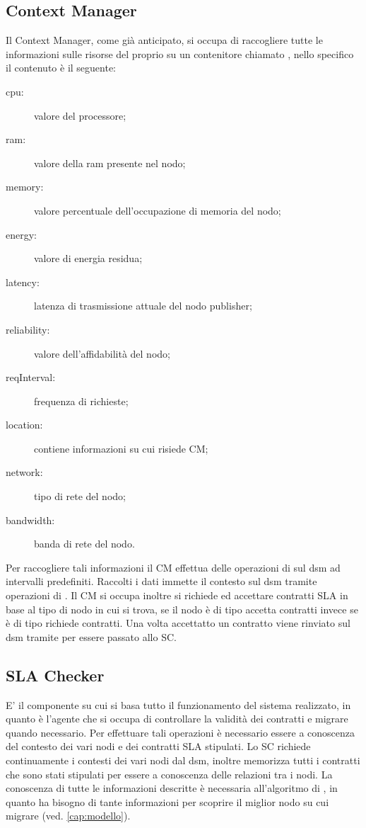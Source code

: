 \subsection{Context Manager}
Il Context Manager, come già anticipato, si occupa di raccogliere tutte le informazioni sulle risorse del proprio su un contenitore chiamato , nello specifico il contenuto è il seguente:
\begin{description}
	\item[cpu:] valore del processore;
	\item[ram:] valore della ram presente nel nodo;
	\item[memory:] valore percentuale dell'occupazione di memoria del nodo;
	\item[energy:] valore di energia residua;
	\item[latency:] latenza di trasmissione attuale del nodo publisher;
	\item[reliability:] valore dell'affidabilità del nodo;
	\item[reqInterval:] frequenza di richieste;
	\item[location:] contiene informazioni su cui risiede CM;
	\item[network:] tipo di rete del nodo;
	\item[bandwidth:] banda di rete del nodo.
\end{description}
Per raccogliere tali informazioni il CM effettua delle operazioni di  sul dsm ad intervalli predefiniti. Raccolti i dati immette il contesto sul dsm tramite operazioni di . Il CM si occupa inoltre si richiede ed accettare contratti SLA in base al tipo di nodo in cui si trova, se il nodo è di tipo  accetta contratti invece se è di tipo  richiede contratti. Una volta accettatto un contratto viene rinviato sul dsm tramite  per essere passato allo SC.
\subsection{SLA Checker}
E' il componente su cui si basa tutto il funzionamento del sistema realizzato, in quanto è l'agente che si occupa di controllare la validità dei contratti e migrare quando necessario. Per effettuare tali operazioni è necessario essere a conoscenza del contesto dei vari nodi e dei contratti SLA stipulati. Lo SC richiede continuamente i contesti dei vari nodi dal dsm, inoltre memorizza tutti i contratti che sono stati stipulati per essere a conoscenza delle relazioni tra i nodi. La conoscenza di tutte le informazioni descritte è necessaria all'algoritmo di , in quanto ha bisogno di tante informazioni per scoprire il miglior nodo su cui migrare (ved. \ref{cap:modello}).